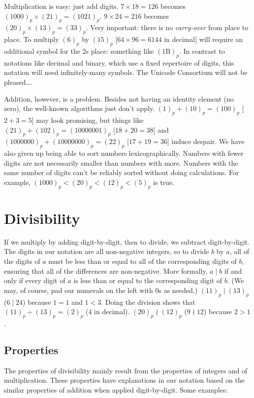 \documentclass[12pt]{article}
\newcommand{\ppn}[1]{(#1)_p}
\begin{document}
Multiplication is easy: just add digits. $7 \times 18 = 126$ becomes $\ppn{1000} \times \ppn{21} = \ppn{1021}$. $9 \times 24 = 216$ becomes $\ppn{20} \times \ppn{13} = \ppn{33}$. Very important: there is no \textit{carry-over} from place to place. To multiply $\ppn{6}$ by $\ppn{15}$ [$64 \times 96 = 6144$ in decimal] will require an additional symbol for the $2$s place: something like $(1\mathrm{B})_p$. In contrast to notations like decimal and binary, which use a fixed repertoire of digits, this notation will need infinitely-many symbols. The Unicode Consortium will not be pleased\ldots.

Addition, however, is a problem. Besides not having an identity element (no zero), the well-known algorithms just don't apply. $\ppn{1} + \ppn{10} = \ppn{100}$ [$2+3=5$] may look promising, but things like $\ppn{21} + \ppn{102} = \ppn{10000001}$ [$18+20=38$] and $\ppn{1000000} + \ppn{10000000} = \ppn{22}$ [$17+19=36$] induce despair. We have also given up being able to sort numbers lexicographically. Numbers with fewer digits are not necessarily smaller than numbers with more. Numbers with the same number of digits can't be reliably sorted without doing calculations. For example, $\ppn{1000} < \ppn{20} < \ppn{12} < \ppn{5}$ is true.

\section*{Divisibility}
If we multiply by adding digit-by-digit, then to divide, we subtract digit-by-digit. The digits in our notation are all non-negative integers, so to divide $b$ by $a$, all of the digits of $a$ must be less than or equal to all of the corresponding digits of $b$, ensuring that all of the differences are non-negative. More formally, $a \mid b$ if and only if every digit of $a$ is less than or equal to the corresponding digit of $b$. (We may, of course, pad our numerals on the left with $0$s as needed.) $\ppn{11} \mid \ppn{13}$ ($6 \mid 24$) because $1 = 1$ and $1 < 3$. Doing the division shows that $\ppn{11} \div \ppn{13} = \ppn{2}$ ($4$ in decimal). $\ppn{20} \nmid \ppn{12}$ ($9 \nmid 12$) because $2 > 1$.

\subsection*{Properties}
The properties of divisibility mainly result from the properties of integers and of multiplication. These properties have explanations in our notation based on the similar properties of addition when applied digit-by-digit. Some examples:
\end{document}
